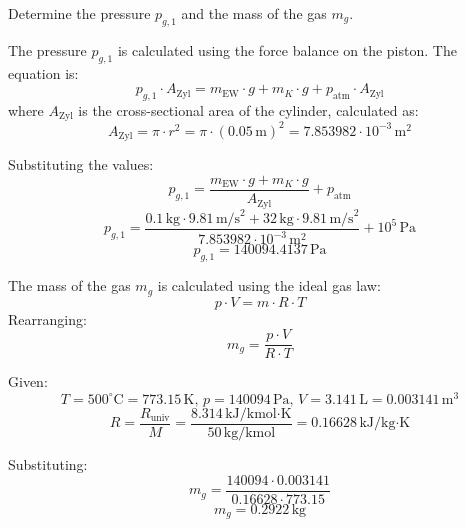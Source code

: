 Determine the pressure \( p_{g,1} \) and the mass of the gas \( m_g \).

The pressure \( p_{g,1} \) is calculated using the force balance on the piston. The equation is:  
\[
p_{g,1} \cdot A_{\text{Zyl}} = m_{\text{EW}} \cdot g + m_K \cdot g + p_{\text{atm}} \cdot A_{\text{Zyl}}
\]  
where \( A_{\text{Zyl}} \) is the cross-sectional area of the cylinder, calculated as:  
\[
A_{\text{Zyl}} = \pi \cdot r^2 = \pi \cdot (0.05 \, \text{m})^2 = 7.853982 \cdot 10^{-3} \, \text{m}^2
\]  

Substituting the values:  
\[
p_{g,1} = \frac{m_{\text{EW}} \cdot g + m_K \cdot g}{A_{\text{Zyl}}} + p_{\text{atm}}
\]  
\[
p_{g,1} = \frac{0.1 \, \text{kg} \cdot 9.81 \, \text{m/s}^2 + 32 \, \text{kg} \cdot 9.81 \, \text{m/s}^2}{7.853982 \cdot 10^{-3} \, \text{m}^2} + 10^5 \, \text{Pa}
\]  
\[
p_{g,1} = 140094.4137 \, \text{Pa}
\]  

The mass of the gas \( m_g \) is calculated using the ideal gas law:  
\[
p \cdot V = m \cdot R \cdot T
\]  
Rearranging:  
\[
m_g = \frac{p \cdot V}{R \cdot T}
\]  

Given:  
\[
T = 500^\circ\text{C} = 773.15 \, \text{K}, \, p = 140094 \, \text{Pa}, \, V = 3.141 \, \text{L} = 0.003141 \, \text{m}^3
\]  
\[
R = \frac{R_{\text{univ}}}{M} = \frac{8.314 \, \text{kJ/kmol·K}}{50 \, \text{kg/kmol}} = 0.16628 \, \text{kJ/kg·K}
\]  

Substituting:  
\[
m_g = \frac{140094 \cdot 0.003141}{0.16628 \cdot 773.15}
\]  
\[
m_g = 0.2922 \, \text{kg}
\]
